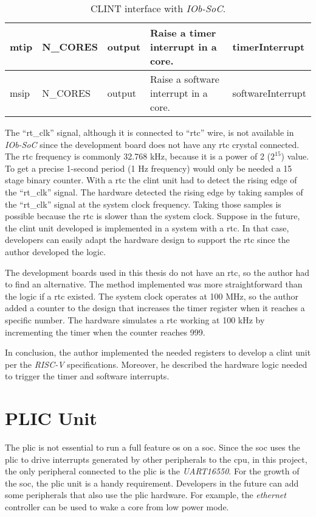 \begin{table}[!ht]
{\begin{tabular}{|l|l|l|l|l|}
  mtip          & N\_CORES       & output             & Raise a timer interrupt in a core.                                                                  & timerInterrupt                       \\ \hline
  msip          & N\_CORES       & output             & Raise a software interrupt in a core.                                                               & softwareInterrupt                    \\ \hline
  \end{tabular}%
  }
  \caption{CLINT interface with \textit{IOb-SoC}.}
  \label{tab:clint_signals}
\end{table}

The \enquote{rt\_clk} signal, although it is connected to \enquote{rtc} wire, is not available in \textit{IOb-SoC} since the development board does not have any \acrfull{rtc} crystal connected. The \acrshort{rtc} frequency is commonly 32.768 kHz, because it is a power of 2 ($2^15$) value. To get a precise 1-second period (1 Hz frequency) would only be needed a 15 stage binary counter. With a \acrshort{rtc} the \acrshort{clint} unit had to detect the rising edge of the \enquote{rt\_clk} signal. The hardware detected the rising edge by taking samples of the \enquote{rt\_clk} signal at the system clock frequency. Taking those samples is possible because the \acrshort{rtc} is slower than the system clock. Suppose in the future, the \acrshort{clint} unit developed is implemented in a system with a \acrshort{rtc}. In that case, developers can easily adapt the hardware design to support the \acrshort{rtc} since the author developed the logic. 

The development boards used in this thesis do not have an \acrshort{rtc}, so the author had to find an alternative. The method implemented was more straightforward than the logic if a \acrshort{rtc} existed. The system clock operates at 100 MHz, so the author added a counter to the design that increases the timer register when it reaches a specific number. The hardware simulates a \acrshort{rtc} working at 100 kHz by incrementing the timer when the counter reaches 999.

In conclusion, the author implemented the needed registers to develop a \acrshort{clint} unit per the \textit{RISC-V} specifications. Moreover, he described the hardware logic needed to trigger the timer and software interrupts.

\section{PLIC Unit}
\label{section:plic}
The \acrshort{plic} is not essential to run a full feature \acrfull{os} on a \acrfull{soc}. Since the \acrshort{soc} uses the \acrshort{plic} to drive interrupts generated by other peripherals to the \acrshort{cpu}, in this project, the only peripheral connected to the \acrshort{plic} is the \textit{UART16550}. For the growth of the \acrshort{soc}, the \acrshort{plic} unit is a handy requirement. Developers in the future can add some peripherals that also use the \acrshort{plic} hardware. For example, the \textit{ethernet} controller can be used to wake a core from low power mode.

